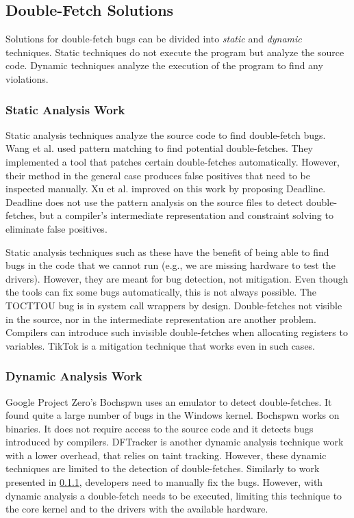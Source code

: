\subsection{Double-Fetch Solutions}

Solutions for double-fetch bugs can be divided into \emph{static} and
\emph{dynamic} techniques. Static techniques do not execute the program but
analyze the source code. Dynamic techniques analyze the execution of the
program to find any violations.

\subsubsection{Static Analysis Work}
\label{subsec:dfstatic}
Static analysis techniques analyze the source code to find double-fetch bugs.
Wang et al. \cite{wang2017double} used pattern matching to find potential
double-fetches. They implemented a tool that patches certain double-fetches
automatically. However, their method in the general case produces false
positives that need to be inspected manually. Xu et al.\cite{xu2018precise}
improved on this work by proposing Deadline. Deadline does not use the pattern 
analysis on the source files to detect double-fetches, but a compiler's
intermediate representation and constraint solving to eliminate false positives.

Static analysis techniques such as these have the benefit of being able to find
bugs in the code that we cannot run (e.g., we are missing hardware to test the
drivers). However, they are meant for bug detection, not mitigation. Even though
the tools can fix some bugs automatically, this is not always possible. The
TOCTTOU bug is in system call wrappers by design. Double-fetches not visible in
the source, nor in the intermediate representation are another problem.
Compilers can introduce such invisible double-fetches when allocating registers
to variables. TikTok is a mitigation technique that works even in such cases.


\subsubsection{Dynamic Analysis Work}
Google Project Zero's Bochspwn \cite{jurczyk2013bochspwn} uses an emulator to
detect double-fetches. It found quite a large number of bugs in the Windows
kernel. Bochspwn works on binaries. It does not require access to the source
code and it detects bugs introduced by compilers.
DFTracker\cite{wang2019dftracker} is another dynamic analysis technique work
with a lower overhead, that relies on taint tracking. However, these dynamic
techniques are limited to the detection of double-fetches. Similarly to work
presented in \cref{subsec:dfstatic}, developers need to manually fix the bugs.
However, with dynamic analysis a double-fetch needs to be executed, limiting
this technique to the core kernel and to the drivers with the available
hardware.

